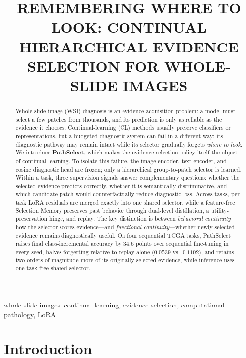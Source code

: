\documentclass{article}
\title{REMEMBERING WHERE TO LOOK: CONTINUAL HIERARCHICAL EVIDENCE SELECTION FOR WHOLE-SLIDE IMAGES}
\begin{document}
\ninept
\maketitle

\begin{abstract}
Whole-slide image (WSI) diagnosis is an evidence-acquisition problem: a model must select a few patches from thousands, and its prediction is only as reliable as the evidence it chooses.
Continual-learning (CL) methods usually preserve classifiers or representations, but a budgeted diagnostic system can fail in a different way: its diagnostic pathway may remain intact while its selector gradually forgets \emph{where to look}.
We introduce \textbf{PathSelect}, which makes the evidence-selection policy itself the object of continual learning.
To isolate this failure, the image encoder, text encoder, and cosine diagnostic head are frozen; only a hierarchical group-to-patch selector is learned.
Within a task, three supervision signals answer complementary questions: whether the selected evidence predicts correctly, whether it is semantically discriminative, and which candidate patch would counterfactually reduce diagnostic loss.
Across tasks, per-task LoRA residuals are merged exactly into one shared selector, while a feature-free Selection Memory preserves past behavior through dual-level distillation, a utility-preservation hinge, and replay.
The key distinction is between \emph{behavioral continuity}---how the selector scores evidence---and \emph{functional continuity}---whether newly selected evidence remains diagnostically useful.
On four sequential TCGA tasks, PathSelect raises final class-incremental accuracy by 34.6 points over sequential fine-tuning in every seed, halves forgetting relative to replay alone ($0.0539$ vs.\ $0.1102$), and retains two orders of magnitude more of its originally selected evidence, while inference uses one task-free shared selector.
\end{abstract}

\begin{keywords}
whole-slide images, continual learning, evidence selection, computational pathology, LoRA
\end{keywords}

\section{Introduction}
\label{sec:intro}
\end{document}
